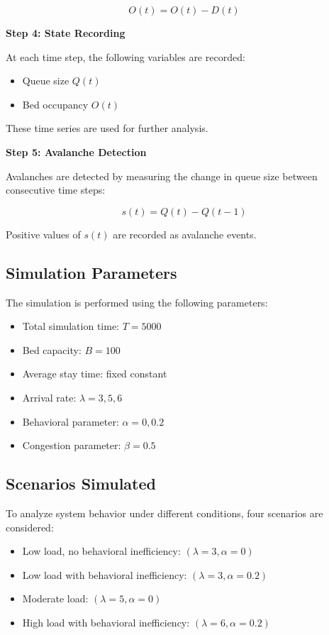 \documentclass[11pt]{article}
\begin{document}
\begin{equation}
O(t) = O(t) - D(t)
\end{equation}

\textbf{Step 4: State Recording}

At each time step, the following variables are recorded:
\begin{itemize}
\item Queue size $Q(t)$
\item Bed occupancy $O(t)$
\end{itemize}

These time series are used for further analysis.

\textbf{Step 5: Avalanche Detection}

Avalanches are detected by measuring the change in queue size between consecutive time steps:

\begin{equation}
s(t) = Q(t) - Q(t-1)
\end{equation}

Positive values of $s(t)$ are recorded as avalanche events.

\subsection{Simulation Parameters}

The simulation is performed using the following parameters:

\begin{itemize}
\item Total simulation time: $T = 5000$
\item Bed capacity: $B = 100$
\item Average stay time: fixed constant
\item Arrival rate: $\lambda = 3, 5, 6$
\item Behavioral parameter: $\alpha = 0, 0.2$
\item Congestion parameter: $\beta = 0.5$
\end{itemize}

\subsection{Scenarios Simulated}

To analyze system behavior under different conditions, four scenarios are considered:

\begin{itemize}
\item Low load, no behavioral inefficiency: $(\lambda = 3, \alpha = 0)$
\item Low load with behavioral inefficiency: $(\lambda = 3, \alpha = 0.2)$
\item Moderate load: $(\lambda = 5, \alpha = 0)$
\item High load with behavioral inefficiency: $(\lambda = 6, \alpha = 0.2)$
\end{itemize}
\end{document}

